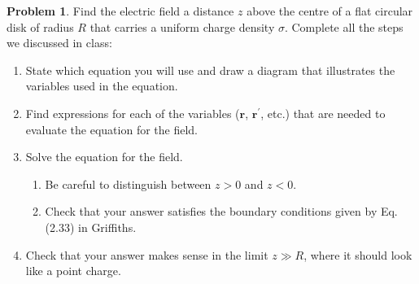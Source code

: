 \documentclass[10pt]{article}
\theoremstyle{definition}
\newtheorem{problem}{Problem}
\begin{document}
\begin{problem}
Find the electric field a distance $z$ above the centre of a flat circular disk of radius $R$ that carries a uniform
charge density $\sigma$. Complete all the steps we discussed in class:
\begin{enumerate}[label=(\alph*)]
  \item State which equation you will use and draw a diagram that illustrates the variables used in the equation.
  \item Find expressions for each of the variables ($\mathbf{r}$, $\mathbf{r}^\prime$, etc.) that are needed to evaluate the equation for the field.
  \item Solve the equation for the field.
        \begin{enumerate}[label=\textbullet]
          \item Be careful to distinguish between $z > 0$ and $z < 0$.
          \item Check that your answer satisfies the boundary conditions given by Eq. (2.33) in Griffiths.
        \end{enumerate}
  \item Check that your answer makes sense in the limit $z \gg R$, where it should look like a point charge.
\end{enumerate}
\end{problem}
\end{document}
